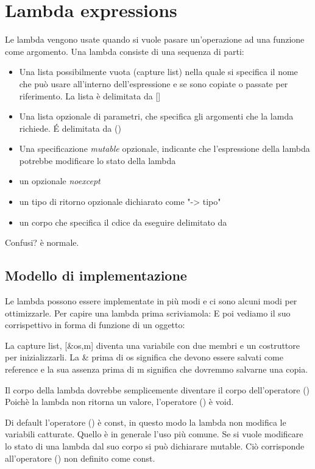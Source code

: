 \documentclass[11pt,a4paper]{book}
\begin{document}
\section{Lambda expressions}
Le lambda vengono usate quando si vuole pasare un'operazione ad una funzione come argomento. Una lambda consiste di una sequenza di parti:
\begin{itemize}
	\item Una lista possibilmente vuota (capture list) nella quale si specifica il nome che può usare all'interno dell'espressione e se sono copiate o passate per riferimento. La lista è delimitata da []
	\item Una lista opzionale di parametri, che specifica gli argomenti che la lamda richiede. É delimitata da ()
	\item Una specificazione \emph{mutable} opzionale, indicante che l'espressione della lambda potrebbe modificare lo stato della lambda
	\item un opzionale \emph{noexcept}
	\item un tipo di ritorno opzionale dichiarato come "-> tipo"
	\item un corpo che specifica il cdice da eseguire delimitato da {}
\end{itemize}

Confusi? è normale.

\subsection{Modello di implementazione}
Le lambda possono essere implementate in più modi e ci sono alcuni modi per ottimizzarle. 
Per capire una lambda prima scriviamola:
\label{code: 173}
E poi vediamo il suo corrispettivo in forma di funzione di un oggetto:
\label{code: 174}

La capture list, [\&os,m] diventa una variabile con due membri e un costruttore per inizializzarli. La \& prima di os significa che devono essere salvati come reference e la sua assenza prima di m significa che dovremmo salvarne una copia.

Il corpo della lambda dovrebbe semplicemente diventare il corpo dell'operatore () Poichè la lambda non ritorna un valore, l'operatore () è void.

Di default l'operatore () è const, in questo modo la lambda non modifica le variabili catturate. Quello è in generale l'uso più comune. Se si vuole modificare lo stato di una lambda dal suo corpo si può dichiarare mutable. Ciò corrisponde all'operatore () non definito come const.
\end{document}

